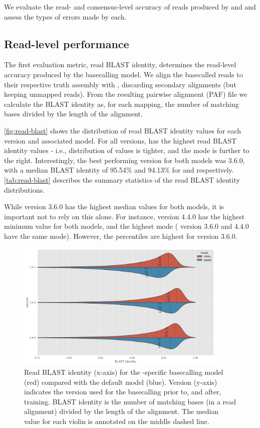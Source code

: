We evaluate the read- and consensus-level accuracy of reads produced by \guppy{} and \tubby{} and assess the types of errors made by each. 

\subsection{Read-level performance}

The first evaluation metric, read BLAST identity, determines the read-level accuracy produced by the basecalling model. We align the basecalled reads to their respective truth assembly with , discarding secondary alignments (but keeping unmapped reads). From the resulting pairwise alignment (PAF) file we calculate the BLAST identity as, for each mapping, the number of matching bases divided by the length of the alignment. 

\autoref{fig:read-blast} shows the distribution of read BLAST identity values for each \guppy{} version and associated \tubby{} model. For all versions, \tubby{} has the highest read BLAST identity values - i.e., distribution of values is tighter, and the mode is further to the right. Interestingly, the best performing version for both models was 3.6.0, with a median BLAST identity of 95.54\% and 94.13\% for \tubby{} and \guppy{} respectively. \autoref{tab:read-blast} describes the summary statistics of the read BLAST identity distributions.

While version 3.6.0 has the highest median values for both models, it is important not to rely on this alone. For instance, version 4.4.0 has the highest minimum value for both models, and the highest mode (\tubby{} version 3.6.0 and 4.4.0 have the same mode). However, the percentiles are highest for version 3.6.0.

\begin{figure}
\includegraphics[width=0.9\textwidth]{Chapter4/Figs/read_blast_identity.png}
\centering
\caption{Read BLAST identity (x-axis) for the \mtb{}-specific basecalling model \tubby{} (red) compared with the default \guppy{} model (blue). Version (y-axis) indicates the \guppy{} version used for the basecalling prior to, and after, training. BLAST identity is the number of matching bases (in a read alignment) divided by the length of the alignment. The median value for each violin is annotated on the middle dashed line.}
\label{fig:read-blast}
\end{figure}

